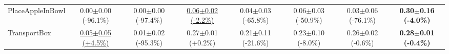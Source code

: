 \begin{table}[htbp]
\begin{adjustbox}{max width=\textwidth}
\begin{tabular}{l*{7}{c}}
PlaceAppleInBowl & 0.00$\pm$0.00 \scriptsize{(-96.1\%)} & 0.00$\pm$0.00 \scriptsize{(-97.4\%)} & \underline{0.06$\pm$0.02 \scriptsize{(-2.2\%)}} & 0.04$\pm$0.03 \scriptsize{(-65.8\%)} & 0.06$\pm$0.03 \scriptsize{(-50.9\%)} & 0.03$\pm$0.06 \scriptsize{(-76.1\%)} & \textbf{0.30$\pm$0.16 \scriptsize{(-4.0\%)}} \\
TransportBox & \underline{0.05$\pm$0.05 \scriptsize{(+4.5\%)}} & 0.01$\pm$0.02 \scriptsize{(-95.3\%)} & 0.27$\pm$0.01 \scriptsize{(+0.2\%)} & 0.21$\pm$0.11 \scriptsize{(-21.6\%)} & 0.23$\pm$0.10 \scriptsize{(-8.0\%)} & 0.26$\pm$0.02 \scriptsize{(-0.6\%)} & \textbf{0.28$\pm$0.01 \scriptsize{(-0.4\%)}} \\
\bottomrule
\end{tabular}
\end{adjustbox}
\end{table}

